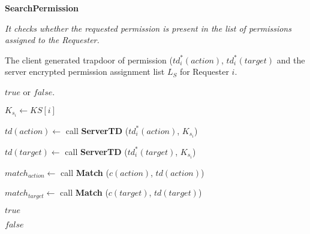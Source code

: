\documentclass[epsfig,a4paper,11pt,titlepage]{book}
\numberwithin{algorithm}{chapter}
\newcommand{\algofontsize}{\fontsize{11}{12}\selectfont}
\begin{document}
\begin{algorithm} [htp]
{\algofontsize
\caption{\textbf{SearchPermission}}

\label{algo:erbac-search-permission}

\begin{algorithmic}[1]

\INPUT \emph{It checks whether the requested permission is present in the list of permissions assigned to the Requester.}

\Require The client generated trapdoor of permission ($td^*_i (action)$, $td^*_i (target)$ and the server encrypted permission assignment list $L_{S}$ for Requester $i$.

\Ensure $\mathit{true}$ or $\mathit{false}$.

\medskip

\State $K_{s_i} \leftarrow KS[i]$ {\algofontsize {}} \label{line:erbac-search-permission-ks}

\State $td(action) \leftarrow$ call \textbf{ServerTD} ($td^*_i (action)$, $K_{s_i}$) \label{line:erbac-search-permission-td-a}

\State $td(target) \leftarrow$ call \textbf{ServerTD} ($td^*_i (target)$, $K_{s_i}$) \label{line:erbac-search-permission-td-t}

 \label{line:erbac-search-permission-loop}

	\State $match_{action} \leftarrow$ call \textbf{Match} ($c(action)$, $td(action)$) \label{line:erbac-search-permission-match-a}
	
	\State $match_{target} \leftarrow$ call \textbf{Match} ($c(target)$, $td(target)$) \label{line:erbac-search-permission-match-t}

	 \label{line:erbac-search-permission-check-match}
	
		\Return $\mathit{true}$ \label{line:erbac-search-permission-true}
		
	\EndIf

\EndFor

\Return $\mathit{false}$ \label{line:erbac-search-permission-false}

\end{algorithmic}
}
\end{algorithm}
\end{document}
